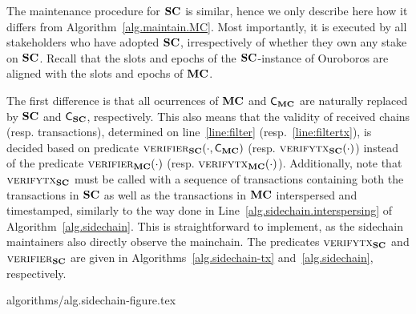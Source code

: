 The maintenance procedure for $\mathbf{SC}$ is similar, hence we only
describe here how it differs from Algorithm~\ref{alg.maintain.MC}. Most
importantly, it is executed by all stakeholders who have adopted $\mathbf{SC}$,
irrespectively of whether they own any stake on $\mathbf{SC}$.
Recall that the slots and epochs of the $\mathbf{SC}$-instance of Ouroboros are aligned
with the slots and epochs of $\mathbf{MC}$.

The first difference is that all ocurrences of $\mathbf{MC}$ and $\mathsf{C_{\mathbf{MC}}}$ are
naturally replaced by $\mathbf{SC}$ and $\mathsf{C_{\mathbf{SC}}}$, respectively.  This also means that
the validity of received chains (resp. transactions), determined on
line~\ref{line:filter} (resp.~\ref{line:filtertx}), is decided based on
predicate
$\textsc{verifier}_{\mathbf{SC}}(\cdot,\mathsf{C_{\mathbf{MC}}})$ (resp.
$\textsc{verifytx}_{\mathbf{SC}}(\cdot)$)
instead of
the predicate
$\textsc{verifier}_{\mathbf{MC}}(\cdot)$ (resp.
$\textsc{verifytx}_{\mathbf{MC}}(\cdot)$). Additionally, note that $\textsc{verifytx}_{\mathbf{SC}}$ must be called
with a sequence of transactions containing both the transactions in $\mathbf{SC}$ as
well as the transactions in $\mathbf{MC}$ interspersed and timestamped, similarly to the
way done in Line~\ref{alg.sidechain.interspersing} of
Algorithm~\ref{alg.sidechain}. This is straightforward to implement, as the
sidechain maintainers also directly observe the mainchain. The predicates
$\textsc{verifytx}_{\mathbf{SC}}$
and
$\textsc{verifier}_{\mathbf{SC}}$
are given in
Algorithms~\ref{alg.sidechain-tx}
and~\ref{alg.sidechain}, respectively.

{algorithms/alg.sidechain-figure.tex}

